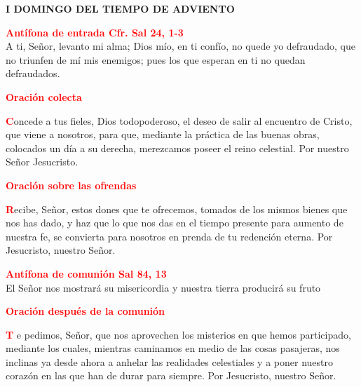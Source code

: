 \documentclass[12pt, letterpaper]{article}
\begin{document}

  \begin{center}
    \Huge {\bfseries I DOMINGO DEL TIEMPO DE ADVIENTO}
  \end{center}

  \Large {\bfseries \textcolor{red}{Ant\'ifona de entrada \hspace{1cm} Cfr. Sal 24, 1-3} }\\
  \Large {A ti, Se\~nor, levanto mi alma; Dios m\'io, en ti conf\'io, no quede yo defraudado, que no triunfen de m\'i mis enemigos; pues los que esperan en ti no quedan defraudados.}

  \Large {\bfseries \textcolor{red}{Oraci\'on colecta}}

  \lettrine[lines=2]{\bfseries \textcolor{red}{C}}{}\Large {oncede a tus fieles, Dios todopoderoso, el deseo de salir al encuentro de Cristo, que viene a nosotros, para que, mediante la pr\'actica de las buenas obras, colocados un d\'ia a su derecha, merezcamos poseer el reino celestial. Por nuestro Se\~nor Jesucristo.}

  \Large {\bfseries \textcolor{red}{Oraci\'on sobre las ofrendas}}

  \lettrine[lines=2]{\bfseries \textcolor{red}{R}}{}\Large ecibe, Se\~nor, estos dones que te ofrecemos, tomados de los mismos bienes que nos has dado, y haz que lo que nos das en el tiempo presente para aumento de nuestra fe, se convierta para nosotros en prenda de tu redenci\'on eterna. Por Jesucristo, nuestro Se\~nor.

  \Large {\bfseries \textcolor{red}{Ant\'ifona de comuni\'on \hspace{1cm} Sal 84, 13}}\\
  \Large El Se\~nor nos mostrar\'a su misericordia y nuestra tierra producir\'a su fruto
  

  \Large {\bfseries \textcolor{red}{Oraci\'on despu\'es de la comuni\'on}}

  \lettrine[lines=2]{\bfseries \textcolor{red}{T}}{}\Large{ e pedimos, Se\~nor, que nos aprovechen los misterios en que hemos participado, mediante los cuales, mientras caminamos en medio de las cosas pasajeras, nos inclinas ya desde ahora a anhelar las realidades celestiales y a poner nuestro coraz\'on en las que han de durar para
  siempre. Por Jesucristo, nuestro Se\~nor.}
\end{document}
